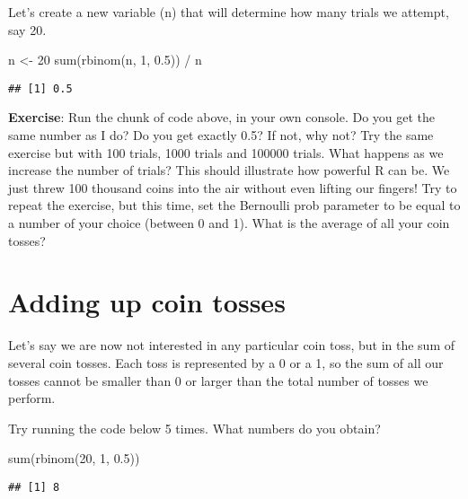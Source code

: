 \documentclass[
]{book}
\newenvironment{Shaded}{\begin{snugshade}}{\end{snugshade}}
\newcommand{\DecValTok}[1]{\textcolor[rgb]{0.00,0.00,0.81}{#1}}
\newcommand{\FloatTok}[1]{\textcolor[rgb]{0.00,0.00,0.81}{#1}}
\newcommand{\FunctionTok}[1]{\textcolor[rgb]{0.00,0.00,0.00}{#1}}
\newcommand{\NormalTok}[1]{#1}
\newcommand{\OtherTok}[1]{\textcolor[rgb]{0.56,0.35,0.01}{#1}}
\newcommand{\SpecialCharTok}[1]{\textcolor[rgb]{0.00,0.00,0.00}{#1}}
\begin{document}
Let's create a new variable (n) that will determine how many trials we attempt, say 20.

\begin{Shaded}
\begin{Highlighting}[]
\NormalTok{n }\OtherTok{\textless{}{-}} \DecValTok{20}
\FunctionTok{sum}\NormalTok{(}\FunctionTok{rbinom}\NormalTok{(n, }\DecValTok{1}\NormalTok{, }\FloatTok{0.5}\NormalTok{)) }\SpecialCharTok{/}\NormalTok{ n}
\end{Highlighting}
\end{Shaded}

\begin{verbatim}
## [1] 0.5
\end{verbatim}

\textbf{Exercise}: Run the chunk of code above, in your own console. Do you get the same number as I do? Do you get exactly 0.5? If not, why not? Try the same exercise but with 100 trials, 1000 trials and 100000 trials. What happens as we increase the number of trials? This should illustrate how powerful R can be. We just threw 100 thousand coins into the air without even lifting our fingers! Try to repeat the exercise, but this time, set the Bernoulli prob parameter to be equal to a number of your choice (between 0 and 1). What is the average of all your coin tosses?

\hypertarget{adding-up-coin-tosses}{%
\section{Adding up coin tosses}\label{adding-up-coin-tosses}}

Let's say we are now not interested in any particular coin toss, but in the sum of several coin tosses. Each toss is represented by a 0 or a 1, so the sum of all our tosses cannot be smaller than 0 or larger than the total number of tosses we perform.

Try running the code below 5 times. What numbers do you obtain?

\begin{Shaded}
\begin{Highlighting}[]
\FunctionTok{sum}\NormalTok{(}\FunctionTok{rbinom}\NormalTok{(}\DecValTok{20}\NormalTok{, }\DecValTok{1}\NormalTok{, }\FloatTok{0.5}\NormalTok{))}
\end{Highlighting}
\end{Shaded}

\begin{verbatim}
## [1] 8
\end{verbatim}
\end{document}
